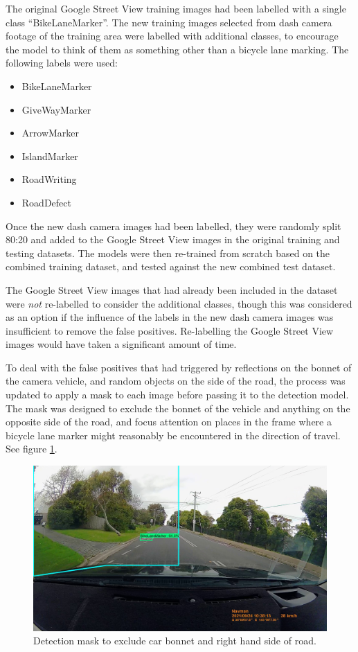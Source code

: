 \documentclass[11pt,twoside]{report}
\begin{document}
The original Google Street View training images had been labelled with a single class ``BikeLaneMarker''.  The new training images selected from dash camera footage of the training area were labelled with additional classes, to encourage the model to think of them as something other than a bicycle lane marking.  The following labels were used:

\begin{itemize}
\item{BikeLaneMarker}
\item{GiveWayMarker}
\item{ArrowMarker}
\item{IslandMarker}
\item{RoadWriting}
\item{RoadDefect}
\end{itemize}

Once the new dash camera images had been labelled, they were randomly split 80:20 and added to the Google Street View images in the original training and testing datasets.  The models were then re-trained from scratch based on the combined training dataset, and tested against the new combined test dataset.

The Google Street View images that had already been included in the dataset were \textit{not} re-labelled to consider the additional classes, though this was considered as an option if the influence of the labels in the new dash camera images was insufficient to remove the false positives.  Re-labelling the Google Street View images would have taken a significant amount of time.

To deal with the false positives that had triggered by reflections on the bonnet of the camera vehicle, and random objects on the side of the road, the process was updated to apply a mask to each image before passing it to the detection model.  The mask was designed to exclude the bonnet of the vehicle and anything on the opposite side of the road, and focus attention on places in the frame where a bicycle lane marker might reasonably be encountered in the direction of travel.  See figure \ref{fig:006}.

\begin{figure}[h!]
\centering
\includegraphics[width=0.5\linewidth]{f006_mask.jpg}
\caption{Detection mask to exclude car bonnet and right hand side of road.}
\label{fig:006}
\end{figure}
\end{document}
